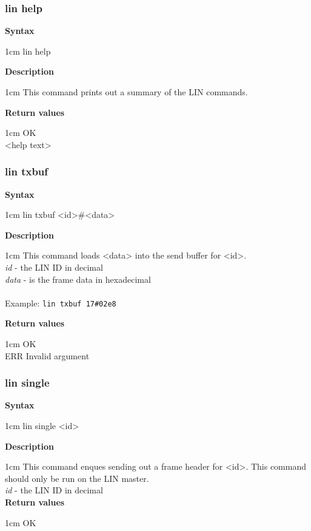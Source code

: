 \documentclass{article}[a4paper]
\begin{document}
\subsubsection{lin help}
\begin{tcolorbox}
	{\bf Syntax}

	 1cm \dimexpr\linewidth-2cm\relax
	lin help

	\medskip
	{\bf Description}

	 1cm \dimexpr\linewidth-2cm\relax
	This command prints out a summary of the LIN commands.

	\medskip
	{\bf Return values}

	 1cm \dimexpr\linewidth-2cm\relax
	OK \\
	<help text>
\end{tcolorbox}

\subsubsection{lin txbuf}
\begin{tcolorbox}
	{\bf Syntax}

	 1cm \dimexpr\linewidth-2cm\relax
	lin txbuf <id>\#<data>

	\medskip
	{\bf Description}

	 1cm \dimexpr\linewidth-2cm\relax
	This command loads <data> into the send buffer for <id>.
	\medskip \\
	{\it id} - the LIN ID in decimal \\
	{\it data} - is the frame data in hexadecimal \\
	\medskip \\
	Example: \texttt{lin txbuf 17\#02e8}

	\medskip
	{\bf Return values}

	 1cm \dimexpr\linewidth-2cm\relax
	OK \\
	ERR Invalid argument
\end{tcolorbox}

\subsubsection{lin single}
\begin{tcolorbox}
	{\bf Syntax}

	 1cm \dimexpr\linewidth-2cm\relax
	lin single <id>

	\medskip
	{\bf Description}

	 1cm \dimexpr\linewidth-2cm\relax
	This command enques sending out a frame header for <id>. This command should
	only be run on the LIN master.
	\medskip \\
	{\it id} - the LIN ID in decimal \\

	\medskip
	{\bf Return values}

	 1cm \dimexpr\linewidth-2cm\relax
	OK
\end{tcolorbox}
\end{document}
